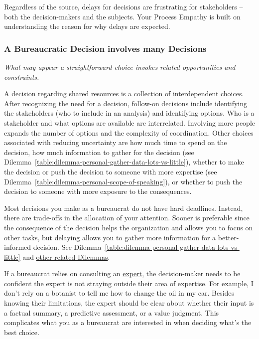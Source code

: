 Regardless of the source, delays for decisions are frustrating for stakeholders -- both the decision-makers and the subjects. Your Process Empathy is built on understanding the reason for why delays are expected.


\subsubsection*{A Bureaucratic Decision involves many Decisions}

\textit{What may appear a straightforward choice invokes related opportunities and constraints.}

A decision regarding shared resources is a collection of interdependent choices. After recognizing the need for a decision, follow-on decisions include identifying the stakeholders (who to include in an analysis) and identifying options. Who is a stakeholder and what options are available are interrelated. Involving more people expands the number of options and the complexity of coordination. Other choices associated with reducing uncertainty are how much time to spend on the decision, how much information to gather for the decision (see Dilemma~\ref{table:dilemma-personal-gather-data-lots-vs-little}),
%
whether to make the decision or push the decision to someone with more expertise (see Dilemma~\ref{table:dilemma-personal-scope-of-speaking}), or whether to push the decision to someone with more exposure to the consequences.

Most decisions you make as a bureaucrat do not have hard deadlines. Instead, there are trade-offs in the allocation of your attention. Sooner is preferable since the consequence of the decision helps the organization and allows you to focus on other tasks, but delaying allows you to gather more information for a better-informed decision. See 
Dilemma~\ref{table:dilemma-personal-gather-data-lots-vs-little}
%
and \hyperref[sec:dilemma-trilemma]{other related Dilemmas}.


If a bureaucrat relies on consulting an
\hyperref[sec:expertise]{expert},
%
the decision-maker needs to be confident the expert is not  straying outside their area of expertise. For example, I don't rely on a botanist  to tell me how to change the oil in my car. 
Besides knowing their limitations, the expert should be clear about whether their input is a factual summary, a predictive assessment, or a value judgment. This complicates what you as a bureaucrat are interested in when deciding what's the best choice.


